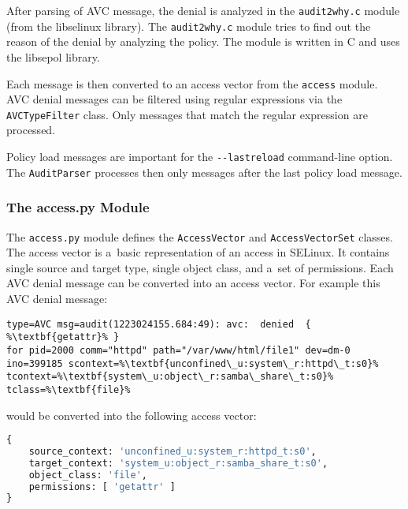 After parsing of AVC message, the denial is analyzed in the \texttt{audit2why.c}
module (from the libselinux library). The \texttt{audit2why.c} module tries to
find out the reason of the denial by analyzing the policy. The module is written
in C and uses the libsepol library.

Each message is then converted to an access vector from the \texttt{access}
module. AVC denial messages can be filtered using regular expressions via the
\texttt{AVCTypeFilter} class. Only messages that match the regular expression
are processed.

Policy load messages are important for the \texttt{-{}-lastreload} command-line
option. The \texttt{AuditParser} processes then only messages after the last
policy load message.

\subsubsection{The access.py Module}

The \texttt{access.py} module defines the \texttt{AccessVector} and
\texttt{AccessVectorSet} classes. The access vector is a~basic representation of
an access in SELinux. It contains single source and target type, single object
class, and a~set of permissions. Each AVC denial message can be converted into
an access vector. For example this AVC denial message:
\begin{lstlisting}[escapechar=\%]
type=AVC msg=audit(1223024155.684:49): avc:  denied  { %\textbf{getattr}% }
for pid=2000 comm="httpd" path="/var/www/html/file1" dev=dm-0
ino=399185 scontext=%\textbf{unconfined\_u:system\_r:httpd\_t:s0}%
tcontext=%\textbf{system\_u:object\_r:samba\_share\_t:s0}% tclass=%\textbf{file}%
\end{lstlisting}
would be converted into the following access vector:
\begin{lstlisting}[language=Python]
{
    source_context: 'unconfined_u:system_r:httpd_t:s0',
    target_context: 'system_u:object_r:samba_share_t:s0',
    object_class: 'file',
    permissions: [ 'getattr' ]
}
\end{lstlisting}

